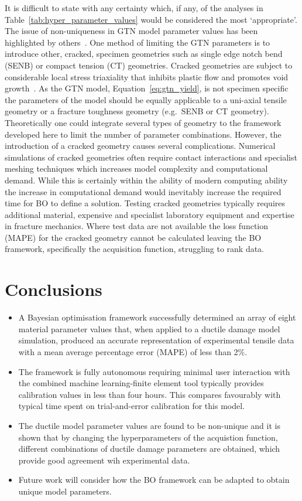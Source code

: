 \documentclass[preprint, review, 12pt]{elsarticle}
\begin{document}
{	It is difficult to state with any certainty which, if any, of the analyses in Table~\ref{tab:hyper_parameter_values} would be considered the most `appropriate'.
	The issue of non-uniqueness in GTN model parameter values has been highlighted by others~\cite{KIRAN2014, CHAHBOUB2019}.
	One method of limiting the GTN parameters is to introduce other, cracked, specimen geometries such as single edge notch bend (SENB) or compact tension (CT) geometries.
	Cracked geometries are subject to considerable local stress triaxiality that inhibits plastic flow and promotes void growth~\cite{BROCKS1995}.
	As the GTN model, Equation~\ref{eq:gtn_yield}, is not specimen specific the parameters of the model should be equally applicable to a uni-axial tensile geometry or a fracture toughness geometry (e.g.\ SENB or CT geometry).
	Theoretically one could integrate several types of geometry to the framework developed here to limit the number of parameter combinations.
	However, the introduction of a cracked geometry causes several complications.
	Numerical simulations of cracked geometries often require contact interactions and specialist meshing techniques which increases model complexity and computational demand.
	While this is certainly within the ability of modern computing ability the increase in computational demand would inevitably increase the required time for BO to define a solution.
	Testing cracked geometries typically requires additional material, expensive and specialist laboratory equipment and expertise in fracture mechanics.
	Where test data are not available the loss function (MAPE) for the cracked geometry cannot be calculated leaving the BO framework, specifically the acquisition function, struggling to rank data.

	\section{Conclusions}
	\label{h:conclusions}

	\begin{itemize}
		\item A Bayesian optimisation framework successfully determined an array of eight material parameter values that, when applied to a ductile damage model simulation, produced an accurate representation of experimental tensile data with a mean average percentage error (MAPE) of less than 2\%.
		\item The framework is fully autonomous requiring minimal user interaction with the combined machine learning-finite element tool typically provides calibration values in less than four hours. This compares favourably with typical time spent on trial-and-error calibration for this model.
		\item The ductile model parameter values are found to be non-unique and it is shown that by changing the hyperparameters of the acquistion function, different combinations of ductile damage parameters are obtained, which provide good agreement wih experimental data.
		\item Future work will consider how the BO framework can be adapted to obtain unique model parameters.
	\end{itemize}

}
\end{document}
